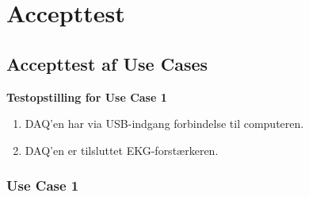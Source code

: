 \chapter{Accepttest}

\section{Accepttest af Use Cases}



\textbf{Testopstilling for Use Case 1}
\begin{enumerate}
	\item DAQ’en har via USB-indgang forbindelse til computeren.
	\item DAQ’en er tilsluttet EKG-forstærkeren.
\end{enumerate}

\subsection{Use Case 1}

